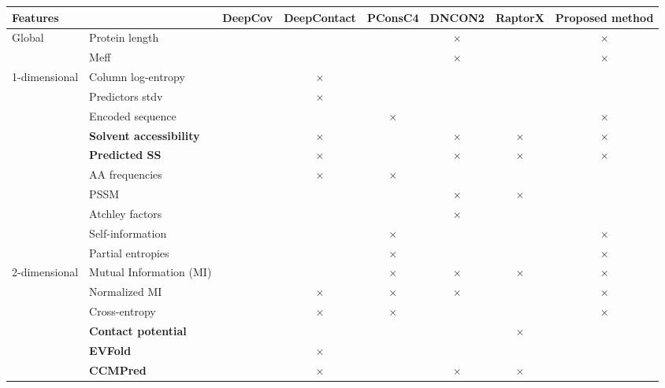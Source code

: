         \begin{landscape}
            \begin{table}[H]
                \centering
                \begin{tabular}{llcccccc}
                    \hline
                    Features & & DeepCov & DeepContact & PConsC4 & DNCON2 & RaptorX & Proposed method \\
                    \hline
                    \hline
                    Global & Protein length & & & & $\times$ & & $\times$ \\
                    & Meff & & & & $\times$ & & $\times$ \\
                    \hline
                    1-dimensional & Column log-entropy & & $\times$ & & & & \\
                    & Predictors stdv & & $\times$ & & & & \\
                    & Encoded sequence & & & $\times$ & & & $\times$ \\
                    & \textbf{Solvent accessibility} & & $\times$ & & $\times$ & $\times$ & $\times$ \\
                    & \textbf{Predicted SS} & & $\times$ & & $\times$ & $\times$ & $\times$ \\
                    & AA frequencies & & $\times$ & $\times$ & & & \\
                    & PSSM & & & & $\times$ & $\times$ & \\
                    & Atchley factors & & & & $\times$ & & \\
                    & Self-information & & & $\times$ & & & $\times$ \\
                    & Partial entropies & & & $\times$ & & & $\times$ \\
                    \hline
                    2-dimensional & Mutual Information (MI) & & & $\times$ & $\times$ & $\times$ & $\times$ \\
                    & Normalized MI & & $\times$ & $\times$ & $\times$ & & $\times$ \\
                    & Cross-entropy & & $\times$ & $\times$ & & & $\times$ \\
                    & \textbf{Contact potential} & & & & & $\times$ & \\
                    & \textbf{EVFold} & & $\times$ & & & & \\
                    & \textbf{CCMPred} & & $\times$ & & $\times$ & $\times$ & \\

\end{tabular}
\end{table}
\end{landscape}
